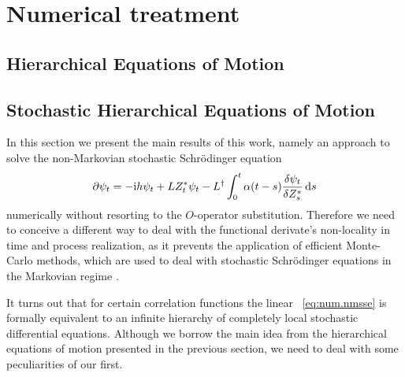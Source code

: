 \chapter{Numerical treatment}
\label{chap:num}


\section{Hierarchical Equations of Motion}
\label{sec:num.heom}


\section{Stochastic Hierarchical Equations of Motion}
\label{sec:num.sheom}
%

In this section we present the main results of this work, namely an approach to solve the non-Markovian stochastic Schrödinger equation
\begin{equation}
  \partial \psi_t = -\mathrm{i} h \psi_t + L{Z}^*_t \psi_t - L^\dagger\int_0^t \alpha(t-s) \frac{\delta\psi_t}{\delta{Z}^*_s} \, \mathrm{d} s
  \label{eq:num.nmsse}
\end{equation}
numerically without resorting to the $O$-operator substitution.
Therefore we need to conceive a different way to deal with the functional derivate's non-locality in time and process realization, as it prevents the application of efficient Monte-Carlo methods, which are used to deal with stochastic Schrödinger equations in the Markovian regime \cite{}.

It turns out that for certain correlation functions the linear \NMSSE~\ref{eq:num.nmsse} is formally equivalent to an infinite hierarchy of completely local stochastic differential equations.
Although we borrow the main idea from the hierarchical equations of motion presented in the previous section, we need to deal with some peculiarities of our \NMSSE first.

